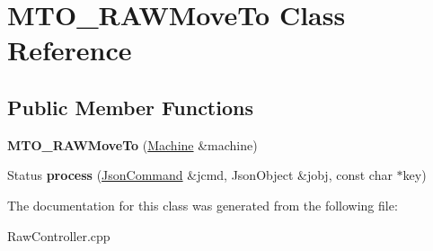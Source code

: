 \hypertarget{class_m_t_o___r_a_w_move_to}{\section{M\+T\+O\+\_\+\+R\+A\+W\+Move\+To Class Reference}
\label{class_m_t_o___r_a_w_move_to}
}
\subsection*{Public Member Functions}
\begin{DoxyCompactItemize}
\item 
\hypertarget{class_m_t_o___r_a_w_move_to_a8ae04f16f348d6a18610bc8689e8a412}{{\bfseries M\+T\+O\+\_\+\+R\+A\+W\+Move\+To} (\hyperlink{classfirestep_1_1_machine}{Machine} \&machine)}\label{class_m_t_o___r_a_w_move_to_a8ae04f16f348d6a18610bc8689e8a412}

\item 
\hypertarget{class_m_t_o___r_a_w_move_to_a06a7927d5cd8575ab3d9ec290316ccf9}{Status {\bfseries process} (\hyperlink{classfirestep_1_1_json_command}{Json\+Command} \&jcmd, Json\+Object \&jobj, const char $\ast$key)}\label{class_m_t_o___r_a_w_move_to_a06a7927d5cd8575ab3d9ec290316ccf9}

\end{DoxyCompactItemize}


The documentation for this class was generated from the following file\+:\begin{DoxyCompactItemize}
\item 
Raw\+Controller.\+cpp\end{DoxyCompactItemize}
